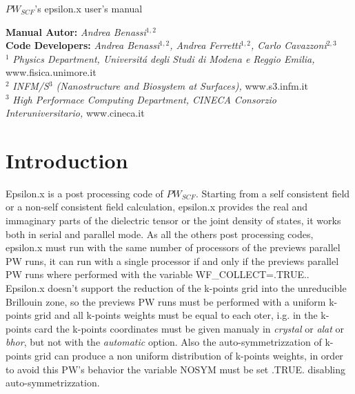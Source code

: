\documentclass[twocolumn]{article}
\begin{document}
\begin{titlepage}
\Huge
\begin{center}
$PW_{SCF}$'s epsilon.x user's manual\\[4.5cm]
\normalsize
\begin{figure}[h]
\centering
{}
\label{logo}
\end{figure}
\vspace{4.5cm}
\textbf{Manual Autor:}
\emph{Andrea Benassi}$^{1,2}$\\[0.3cm]
\textbf{Code Developers:}
\emph{Andrea Benassi$^{1,2}$, Andrea Ferretti$^{1,2}$, Carlo Cavazzoni$^{2,3}$}\\[1cm]
$^{1}$ \emph{Physics Department, Universit\'a degli Studi di Modena e Reggio Emilia,} www.fisica.unimore.it\\
$^{2}$ \emph{INFM/S$^{3}$ (Nanostructure and Biosystem at Surfaces),} www.s3.infm.it\\
$^{3}$ \emph{High Performace Computing Department, CINECA Consorzio Interuniversitario,} www.cineca.it\\
\end{center}
\end{titlepage}
\newpage
\section{Introduction}
Epsilon.x is a post processing code of $PW_{SCF}$. Starting from a self consistent field or a non-self consistent field calculation,
epsilon.x provides the real and immaginary parts of the dielectric tensor or the joint density of states, it works both in serial and
parallel mode. As all the others post processing codes, epsilon.x must run with the same number of
processors of the previews parallel PW runs, it can run with a single processor if and only if the previews parallel PW runs where
performed with the
variable WF\_COLLECT=.TRUE..\\
Epsilon.x doesn't support the reduction of the k-points grid into the unreducible Brillouin zone, so the previews PW runs must be 
performed with a uniform k-points grid and all k-points weights must be equal to each oter, i.g. in the k-points card the k-points
coordinates must be given manualy in \emph{crystal} or \emph{alat} or \emph{bhor}, but not with the \emph{automatic} option. Also the 
auto-symmetrizzation of k-points grid can produce a non uniform distribution of k-points weights, in order to avoid this
PW's behavior the variable NOSYM must be set .TRUE. disabling auto-symmetrizzation.
\end{document}

